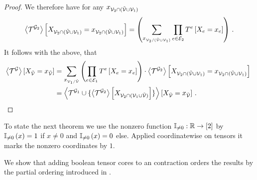 \begin{proof}
	We therefore have for any $x_{\mathcal{V}_2\cap(\tilde{\mathcal{V}}\cup\mathcal{V}_1)}$
	\begin{align*}
		\left\langle \mathcal{T}^{\mathcal{G}_2}\right\rangle \left[ X_{\mathcal{V}_2\cap(\tilde{\mathcal{V}}\cup\mathcal{V}_1)}=x_{\mathcal{V}_2\cap(\tilde{\mathcal{V}}\cup\mathcal{V}_1)} \right] =
		 \left( \sum_{x_{\mathcal{V}_2/(\tilde{\mathcal{V}}\cup\mathcal{V}_1)}}  \prod_{e\in\mathcal{E}_2} T^{e}\left[X_{e}=x_{e}\right]  \right) \, .
	\end{align*}
	It follows with the above, that
	\begin{align*}
		\contractionof{\tnetof{\graph}}{\indexedcatvariableof{\secnodes}}
		& =  \sum_{\catindexof{\nodes_1/\secnodes}}  \left( \prod_{\edge\in\edges_1} \hypercoreofat{\edge}{\indexedcatvariableof{\edge}} \right) \cdot \sbcontractionof{\tnetof{\graph_2}}{\indexedcatvariableof{\nodes_2\cap(\secnodes\cup\nodes_1)}} \\
		& = \contractionof{\tnetof{\graph_1} \cup \{
			\contractionof{\tnetof{\graph_2}}{\catvariableof{\nodes_2\cap(\nodes_1\cup\secnodes)}}
		\}}{\indexedcatvariableof{\secnodes}}   \, .
	\end{align*}
\end{proof}







\label{sec:supportContractionEquations}


To state the next theorem we use the nonzero function $\mathbb{I}_{\neq0}: \mathbb{R} \rightarrow [2]$ by $\mathbb{I}_{\neq0}\left(x\right)=1$ if $x\neq0$ and $\mathbb{I}_{\neq0}\left(x\right)=0$ else.
Applied coordinatewise on tensors it marks the nonzero coordinates by $1$.

We show that adding boolean tensor cores to an contraction orders the results by the partial ordering introduced in .

